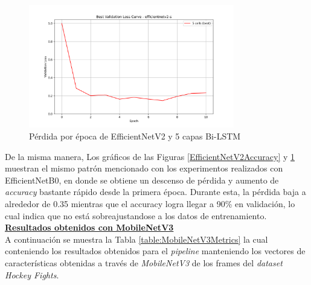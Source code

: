 \begin{figure}[h!] 
    \includegraphics[width=0.8\textwidth]{../graphs/efficientnetv2-s_best_val_loss.png}
    \centering 
    \caption{Pérdida por época de EfficientNetV2 y 5 capas Bi-LSTM } 
    \label{EfficientNetV2Loss} 
\end{figure}


De la misma manera, Los gráficos de las Figuras \ref{EfficientNetV2Accuracy} y 
\ref{EfficientNetV2Loss} muestran el mismo patrón mencionado con los 
experimentos realizados con EfficientNetB0, en donde se obtiene un 
descenso de pérdida y aumento de \textit{accuracy} bastante rápido desde 
la primera época. Durante esta, la pérdida baja a alrededor 
de 0.35 mientras que el accuracy logra llegar a 90\% en validación, 
lo cual indica que no está sobreajustandose a los datos de entrenamiento.\\ 

\textbf{\underline{Resultados obtenidos con MobileNetV3}}\\

A continuación se muestra la Tabla \ref{table:MobileNetV3Metrics} 
la cual conteniendo los resultados obtenidos para el 
\textit{pipeline} manteniendo los vectores de características 
obtenidas a través de \textit{MobileNetV3} de los frames del 
\textit{dataset Hockey Fights}.

